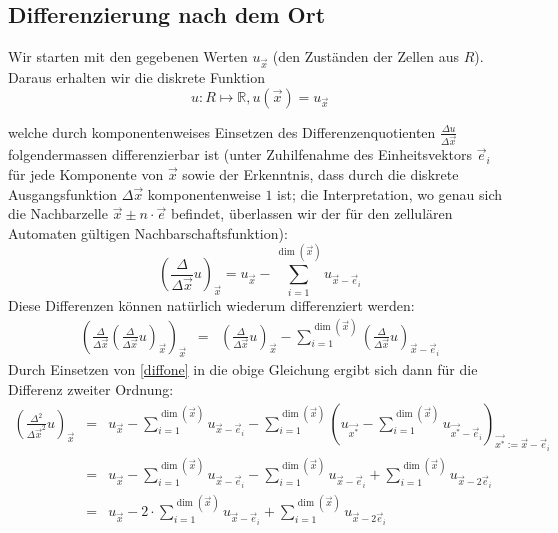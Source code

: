 \documentclass[11pt]{report} %
\theoremstyle{definition}
\begin{document}
\subsection{Differenzierung nach dem Ort}


Wir starten mit den gegebenen Werten $u_{\vec x}$ (den Zuständen der Zellen aus $R$). Daraus erhalten wir die diskrete Funktion
\[
u: R \mapsto \mathbb{R}, u(\vec x) = u_{\vec x}
\]

welche durch komponentenweises Einsetzen des Differenzenquotienten $\frac {\Delta u}{\Delta \vec x}$ folgendermassen differenzierbar ist (unter Zuhilfenahme des Einheitsvektors $\vec e_i$ für jede Komponente von $\vec x$ sowie der Erkenntnis, dass durch die diskrete Ausgangsfunktion $\Delta \vec{x}$ komponentenweise $1$ ist; die Interpretation, wo genau sich die Nachbarzelle $\vec x \pm n\cdot\vec e$ befindet, überlassen wir der für den zellulären Automaten gültigen Nachbarschaftsfunktion):
\begin{equation}\label{diffone}
	\left(\frac {\Delta}{\Delta \vec x} u\right)_{\vec x} = u_{\vec x} - \sum\limits_{i=1}^{\dim(\vec x)} u_{\vec x - \vec e_i}
\end{equation}
Diese Differenzen können natürlich wiederum differenziert werden:
\begin{eqnarray*}
	\left(\frac{\Delta}{\Delta \vec x}\left( \frac {\Delta}{\Delta \vec x} u \right)_{\vec x}\right)_{\vec x} &=& \left(\frac {\Delta}{\Delta \vec x} u\right)_{\vec x} - \sum\limits_{i=1}^{\dim(\vec x)} \left( \frac {\Delta}{\Delta \vec x} u \right)_{\vec x - \vec e_i}
\end{eqnarray*}
Durch Einsetzen von \ref{diffone} in die obige Gleichung ergibt sich dann für die Differenz zweiter Ordnung:
\begin{eqnarray*}
\left( \frac{\Delta^2}{\Delta \vec x^2} u\right)_{\vec x} &=& u_{\vec x} - \sum\limits_{i=1}^{\dim(\vec x)} u_{\vec x - \vec e_i} - 
\sum\limits_{i=1}^{\dim(\vec x)} \left( u_{\vec {x^*}} - \sum\limits_{i=1}^{\dim(\vec x)} u_{\vec {x^*} - \vec e_i} \right)_{\vec {x^*} := \vec x - \vec e_i} \\
&=& u_{\vec x} - \sum\limits_{i=1}^{\dim(\vec x)} u_{\vec x - \vec e_i} - \sum\limits_{i=1}^{\dim(\vec x)} u_{\vec x - \vec e_i} + \sum\limits_{i=1}^{\dim(\vec x)} u_{\vec x - 2\vec e_i} \\
&=&  u_{\vec x} - 2\cdot\sum\limits_{i=1}^{\dim(\vec x)} u_{\vec x - \vec e_i} + \sum\limits_{i=1}^{\dim(\vec x)} u_{\vec x - 2\vec e_i}
\end{eqnarray*}
\end{document}
